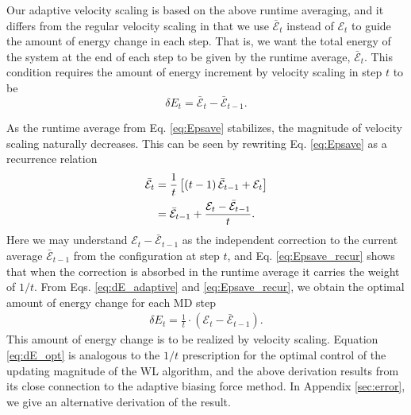 \documentclass[preprint]{revtex4-1}
\begin{document}
Our adaptive velocity scaling is based on
the above runtime averaging,
and it differs from the regular velocity scaling
in that we use $\bar{\mathcal E}_t$
instead of $\mathcal E_t$
to guide the amount of energy change in each step.
%
That is, we want
the total energy of the system
at the end of each step
to be given by
the runtime average, $\bar{\mathcal E}_t$.
%
This condition requires the amount of energy increment
by velocity scaling in step $t$ to be
%
\begin{equation}
  \delta E_t
  =
  \bar{\mathcal E}_t - \bar{\mathcal E}_{t - 1}
  .
  \label{eq:dE_adaptive}
\end{equation}

As the runtime average from Eq. \eqref{eq:Epsave}
stabilizes, the magnitude of velocity scaling
naturally decreases.
%
This can be seen by rewriting Eq. \eqref{eq:Epsave}
as a recurrence relation
%
\begin{align}
  \bar{\mathcal E}_t
  &=
  \frac{1}{t}
  \left[
    (t - 1) \, \bar{\mathcal E}_{t - 1}
    + \mathcal E_t
  \right]
  \notag \\
  &=
  \bar{\mathcal E}_{t - 1}
  +
  \frac{
    \mathcal E_t - \bar{\mathcal E}_{t - 1}
  }
  {
    t
  }
  .
\label{eq:Epsave_recur}
\end{align}
%
Here we may understand $\mathcal E_t - \bar{\mathcal E}_{t - 1}$
as the independent correction
to the current average $\bar{\mathcal E}_{t - 1}$
from the configuration at step $t$,
and Eq. \eqref{eq:Epsave_recur} shows that
when the correction is absorbed in the runtime average
it carries the weight of $1/t$.
%
From Eqs. \eqref{eq:dE_adaptive} and \eqref{eq:Epsave_recur},
we obtain the optimal amount of energy change
for each MD step
\begin{align}
  \delta E_t
  =
  \frac{ 1 } { t }
  \cdot
  \left( \mathcal E_t - \bar{\mathcal E}_{t - 1} \right)
  .
  \label{eq:dE_opt}
\end{align}
%
This amount of energy change is to be realized by velocity scaling.
%
Equation \eqref{eq:dE_opt} is analogous to the $1/t$ prescription\cite{
  belardinelli2007, belardinelli2007jcp, belardinelli2008,
  zhou2005, zhou2008, morozov2007}
for the optimal control of the updating magnitude
of the WL algorithm\cite{wang2001, wang2001pre},
and the above derivation results from its close connection\cite{
  marsili2006, barducci2008}
to the adaptive biasing force method\cite{darve2001, darve2008}.
%
In Appendix \ref{sec:error}, we give an alternative derivation of the result.
\end{document}
